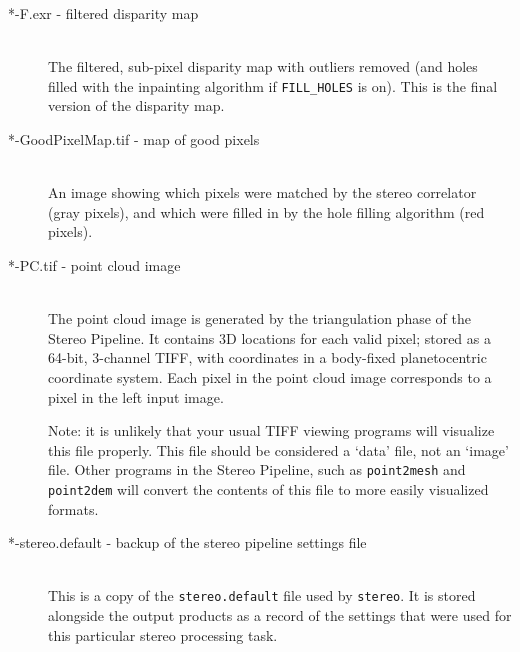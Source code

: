 \begin{description}
\item[*-F.exr \textnormal{- filtered disparity map}] \hfill \\ 
  The filtered, sub-pixel disparity map with outliers removed (and
  holes filled with the inpainting algorithm if \texttt{FILL\_HOLES}
  is on).  This is the final version of the disparity map.

\item[*-GoodPixelMap.tif \textnormal{- map of good pixels}] \hfill \\
  An image showing which pixels were matched by the stereo correlator
  (gray pixels), and which were filled in by the hole filling
  algorithm (red pixels).

\item[*-PC.tif \textnormal{- point cloud image}] \hfill \\
  The point cloud image is generated by the triangulation phase of the
  Stereo Pipeline.  It contains 3D locations for each valid pixel;
  stored as a 64-bit, 3-channel TIFF, with coordinates in a body-fixed
  planetocentric coordinate system.  Each pixel in the point cloud
  image corresponds to a pixel in the left input image.

  Note: it is unlikely that your usual TIFF viewing programs will
  visualize this file properly.  This file should be considered a
  `data' file, not an `image' file.  Other programs in the Stereo
  Pipeline, such as {\tt point2mesh} and {\tt point2dem} will convert
  the contents of this file to more easily visualized formats.

\item[*-stereo.default \textnormal{- backup of the stereo pipeline settings file}] \hfill \\ 
  This is a copy of the \texttt{stereo.default} file used by
  \texttt{stereo}.  It is stored alongside the output products as
  a record of the settings that were used for this particular stereo
  processing task.

\end{description}
